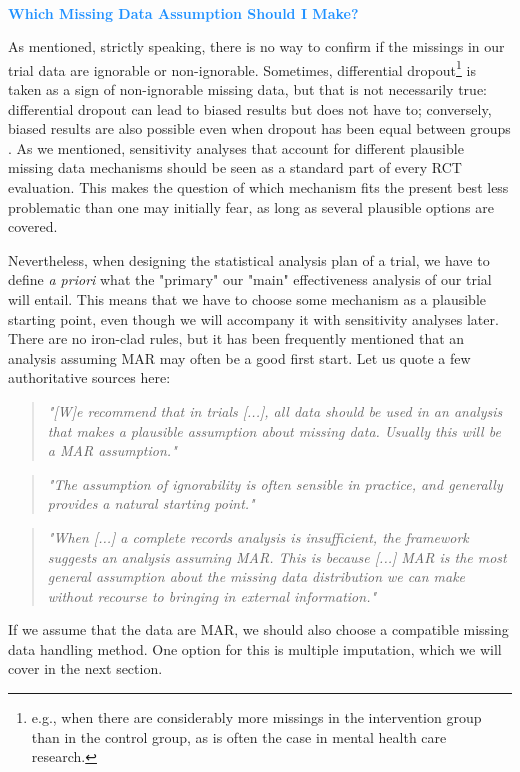 \begin{box-info} \\
\textcolor{dodgerblue}{\textbf{Which Missing Data Assumption Should I Make?}} 

\vspace{2mm}

As mentioned, strictly speaking, there is no way to confirm if the missings in our trial data are ignorable or non-ignorable. Sometimes, differential dropout\footnote{e.g., when there are considerably more missings in the intervention group than in the control group, as is often the case in mental health care research.} is taken as a sign of non-ignorable missing data, but that is not necessarily true: differential dropout can lead to biased results but does not have to; conversely, biased results are also possible even when dropout has been equal between groups \citep{bell2013differential}. As we mentioned, sensitivity analyses that account for different plausible missing data mechanisms should be seen as a standard part of every RCT evaluation. This makes the question of which mechanism fits the present best less problematic than one may initially fear, as long as several plausible options are covered. 

\vspace{2mm}

Nevertheless, when designing the statistical analysis plan of a trial, we have to define \emph{a priori} what the "primary" our "main" effectiveness analysis of our trial will entail. This means that we have to choose some mechanism as a plausible starting point, even though we will accompany it with sensitivity analyses later. There are no iron-clad rules, but it has been frequently mentioned that an analysis assuming MAR may often be a good first start. Let us quote a few authoritative sources here:

\begin{quote}
\emph{"[W]e recommend that in trials [...], all data should be used in an analysis that makes a plausible assumption about missing data. Usually this will be a MAR assumption."} \citep{bell2014handling}
\end{quote}

\begin{quote}
\emph{"The assumption of ignorability is often sensible in practice, and generally provides a natural starting point."} \citep[][, chap. 2.2.6]{fimd}
\end{quote}

\begin{quote}
\emph{"When [...] a complete records analysis is insufficient, the framework suggests an analysis assuming MAR. This is because [...] MAR is the most general assumption about the missing data distribution we can make without recourse to bringing in external information."} \citep[][]{carpenter2021missing}
\end{quote}

If we assume that the data are MAR, we should also choose a compatible missing data handling method. One option for this is multiple imputation, which we will cover in the next section. 

\end{box-info}

